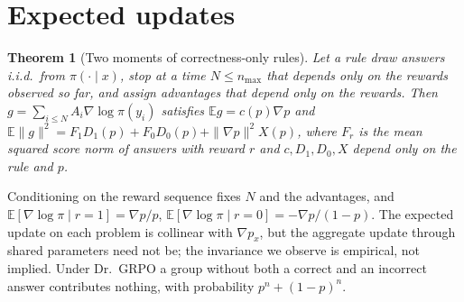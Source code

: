 \documentclass{article}
\theoremstyle{plain}
\newtheorem{theorem}{Theorem}[section]
\newcommand{\E}{\mathbb E}
\begin{document}
\section{Expected updates}\label{app:theory}
\begin{theorem}[Two moments of correctness-only rules]
Let a rule draw answers i.i.d.\ from $\pi(\cdot\mid x)$, stop at a time $N\le n_{\max}$ that depends only on the rewards observed so far, and assign advantages that depend only on the rewards. Then $g=\sum_{i\le N}A_i\nabla\log\pi(y_i)$ satisfies $\E g=c(p)\nabla p$ and $\E\|g\|^2=F_1D_1(p)+F_0D_0(p)+\|\nabla p\|^2X(p)$, where $F_r$ is the mean squared score norm of answers with reward $r$ and $c,D_1,D_0,X$ depend only on the rule and $p$.
\end{theorem}
Conditioning on the reward sequence fixes $N$ and the advantages, and $\E[\nabla\log\pi\mid r=1]=\nabla p/p$, $\E[\nabla\log\pi\mid r=0]=-\nabla p/(1-p)$. The expected update on each problem is collinear with $\nabla p_x$, but the aggregate update through shared parameters need not be; the invariance we observe is empirical, not implied. Under Dr.\ GRPO a group without both a correct and an incorrect answer contributes nothing, with probability $p^n+(1-p)^n$.
\end{document}
